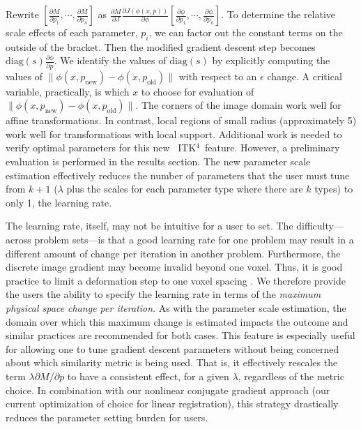 \documentclass{frontiersSCNS}
\newcommand{\tk}{~ITK$^{\text{4}}$~}
\begin{document}
Rewrite $[ \frac{\partial
  M}{\partial p_1} , \cdots , \frac{\partial
  M}{\partial p_n} 
 ]$ as $\frac{\partial M}{\partial J}\frac{\partial
  J(\phi(x,p))}{\partial \phi} [ \frac{\partial \phi}{\partial p_1} , \cdots , \frac{\partial \phi}{\partial p_n} ]$.
To determine the relative scale effects of each parameter, $p_i$, we
can factor out the constant terms on the outside of the bracket.  
Then the modified gradient descent step becomes
$\text{diag}(s)\frac{\partial \phi}{\partial p}$.  We identify the values
of $\text{diag}(s)$ by explicitly computing the values of $\| \phi(x,p_{\text{new}}) -
\phi(x,p_\text{old}) \| $ with respect to an $\epsilon$ change.  A critical variable,
practically, is which $x$ to choose for evaluation of $\| \phi(x,p_{\text{new}}) -
\phi(x,p_\text{old}) \| $.  The corners of the image domain work well
for affine transformations.  In contrast, local regions of small radius
(approximately 5) work well for transformations with local support.
Additional work is needed to verify optimal parameters for this new
\tk feature.  However, a preliminary evaluation is performed in the results
section.  The new parameter scale estimation effectively reduces the number of parameters
that the user must tune from $k+1$ ($\lambda$ plus the scales for each
parameter type where there are $k$ types) to only 1, the learning
rate.  

The learning rate, itself, may not be intuitive for a user to set.
The difficulty---across problem sets---is that a good learning rate for
one problem may result in a different amount of change per iteration
in another problem.  Furthermore, the discrete image gradient may
become invalid beyond one voxel.  Thus, it is good practice to limit a deformation step to one voxel spacing
\cite{Jenkinson2001}.  We therefore provide the users the ability to
specify the learning rate in terms of the {\em maximum physical space change
  per iteration}.  As with the parameter scale estimation, the domain
over which this maximum change is estimated impacts the outcome and
similar practices are recommended for both cases.   This feature is
especially useful for allowing one to tune gradient descent parameters
without being concerned about which similarity metric is being used.
That is, it effectively rescales the term $\lambda \partial M / \partial p$ to
have a consistent effect, for a given $\lambda$, regardless of the
metric choice.  In combination with our nonlinear conjugate gradient
approach (our current optimization of choice for linear registration),
this strategy drastically reduces the parameter setting burden for
users. 
\end{document}

